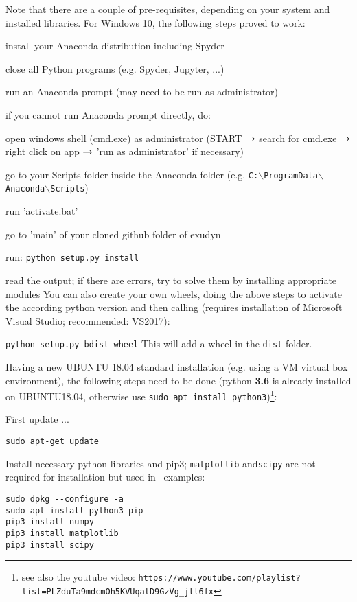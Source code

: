 Note that there are a couple of pre-requisites, depending on your system and installed libraries. For Windows 10, the following steps proved to work:
\bi
  \item install your Anaconda distribution including Spyder
  \item close all Python programs (e.g. Spyder, Jupyter, ...)
	\item run an Anaconda prompt (may need to be run as administrator)
	\item if you cannot run Anaconda prompt directly, do:
	\bi
	  \item open windows shell (cmd.exe) as administrator (START $\rightarrow$ search for cmd.exe $\rightarrow$ right click on app $\rightarrow$ 'run as administrator' if necessary)
		\item go to your Scripts folder inside the Anaconda folder (e.g. \texttt{C:$\backslash$ProgramData$\backslash$Anaconda$\backslash$Scripts})
	  \item run 'activate.bat'
	\ei
	\item go to 'main' of your cloned github folder of exudyn
	\item run: \texttt{python setup.py install}
	\item read the output; if there are errors, try to solve them by installing appropriate modules
\ei
You can also create your own wheels, doing the above steps to activate the according python version and then calling (requires installation of Microsoft Visual Studio; recommended: VS2017):
\bi
  \item[] \texttt{python setup.py bdist\_wheel}
\ei
This will add a wheel in the \texttt{dist} folder.


Having a new UBUNTU 18.04 standard installation (e.g. using a VM virtual box environment), the following steps need to be done (python {\bf 3.6} is already installed on UBUNTU18.04, otherwise use \texttt{sudo apt install python3})\footnote{see also the youtube video: \texttt{https://www.youtube.com/playlist?list=PLZduTa9mdcmOh5KVUqatD9GzVg\_jtl6fx}}:

\noindent First update ...
\begin{lstlisting}[firstnumber=1]
sudo apt-get update
\end{lstlisting}

\noindent Install necessary python libraries and pip3; \texttt{matplotlib} and\texttt{scipy} are not required for installation but used in \codeName\ examples:
\begin{lstlisting}[firstnumber=1]
sudo dpkg --configure -a
sudo apt install python3-pip
pip3 install numpy
pip3 install matplotlib
pip3 install scipy
\end{lstlisting}

